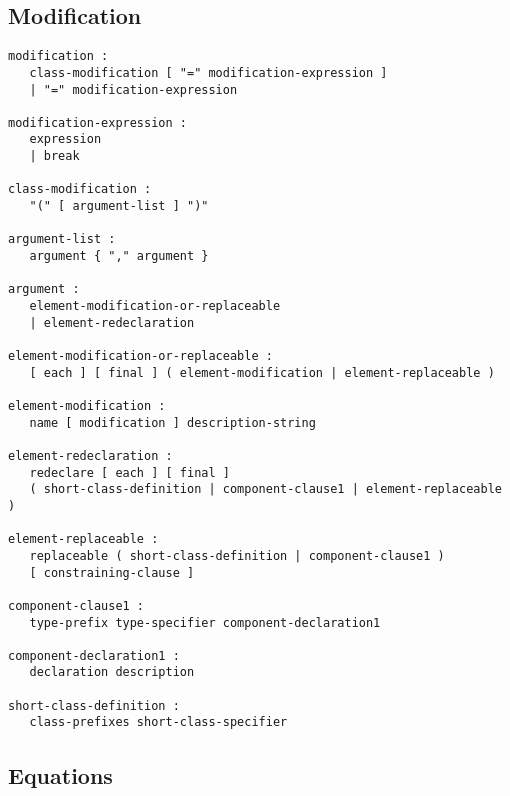 \subsection{Modification}\label{modification}

\begin{lstlisting}[language=grammar]
modification :
   class-modification [ "=" modification-expression ]
   | "=" modification-expression

modification-expression :
   expression
   | break

class-modification :
   "(" [ argument-list ] ")"

argument-list :
   argument { "," argument }

argument :
   element-modification-or-replaceable
   | element-redeclaration

element-modification-or-replaceable :
   [ each ] [ final ] ( element-modification | element-replaceable )

element-modification :
   name [ modification ] description-string

element-redeclaration :
   redeclare [ each ] [ final ]
   ( short-class-definition | component-clause1 | element-replaceable )

element-replaceable :
   replaceable ( short-class-definition | component-clause1 )
   [ constraining-clause ]

component-clause1 :
   type-prefix type-specifier component-declaration1

component-declaration1 :
   declaration description

short-class-definition :
   class-prefixes short-class-specifier
\end{lstlisting}


\subsection{Equations}\label{equations1}


